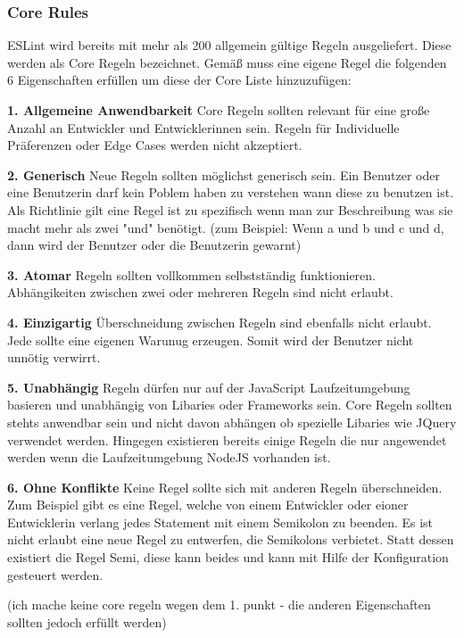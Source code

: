 \subsubsection{Core Rules}
\label{subsubsection:core_rules}

ESLint wird bereits mit mehr als 200 allgemein gültige Regeln ausgeliefert. Diese werden als Core Regeln bezeichnet. Gemäß \autocite{ESLintNewRules} muss eine eigene Regel die folgenden 6 Eigenschaften erfüllen um diese der Core Liste hinzuzufügen:


\textbf{1. Allgemeine Anwendbarkeit}
Core Regeln sollten relevant für eine große Anzahl an Entwickler und Entwicklerinnen sein. Regeln für Individuelle Präferenzen oder Edge Cases werden nicht akzeptiert.

\textbf{2. Generisch}
Neue Regeln sollten möglichst generisch sein. Ein Benutzer oder eine Benutzerin darf kein Poblem haben zu verstehen wann diese zu benutzen ist. Als Richtlinie gilt eine Regel ist zu spezifisch wenn man zur Beschreibung was sie macht mehr als zwei "und" benötigt. (zum Beispiel: Wenn a und b und c und d, dann wird der Benutzer oder die Benutzerin gewarnt)

\textbf{3. Atomar}
Regeln sollten vollkommen selbstständig funktionieren. Abhängikeiten zwischen zwei oder mehreren Regeln sind nicht erlaubt.

\textbf{4. Einzigartig}
Überschneidung zwischen Regeln sind ebenfalls nicht erlaubt. Jede sollte eine eigenen Warunug erzeugen. Somit wird der Benutzer nicht unnötig verwirrt.

\textbf{5. Unabhängig}
Regeln dürfen nur auf der JavaScript Laufzeitumgebung basieren und unabhängig von Libaries oder Frameworks sein. Core Regeln sollten stehts anwendbar sein und nicht davon abhängen ob spezielle Libaries wie JQuery verwendet werden. Hingegen existieren bereits einige Regeln die nur angewendet werden wenn die Laufzeitumgebung NodeJS vorhanden ist.

\textbf{6. Ohne Konflikte}
Keine Regel sollte sich mit anderen Regeln überschneiden. Zum Beispiel gibt es eine Regel, welche von einem Entwickler oder eioner Entwicklerin verlang jedes Statement mit einem Semikolon zu beenden. Es ist nicht erlaubt eine neue Regel zu entwerfen, die Semikolons verbietet. Statt dessen existiert die Regel Semi, diese kann beides und kann mit Hilfe der Konfiguration gesteuert werden.

(ich mache keine core regeln wegen dem 1. punkt - die anderen Eigenschaften sollten jedoch erfüllt werden)


